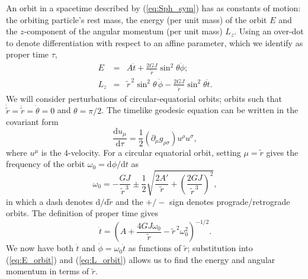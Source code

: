 \documentclass[aps,prd,amsfonts,amssymb,amsmath,nofootinbib,reprint,showpacs]{revtex4-1}
\newcommand{\eqnref}[1]{(\ref{eq:#1})}
\newcommand{\dd}{\ensuremath{\text{d}}}
\begin{document}
An orbit in a spacetime described by \eqnref{Sph_sym} has as constants of motion: the orbiting particle's rest mass, the energy (per unit mass) of the orbit $E$ and the $z$-component of the angular momentum (per unit mass) $L_z$. Using an over-dot to denote differentiation with respect to an affine parameter, which we identify as proper time $\tau$,
\begin{eqnarray}
\label{eq:E_orbit}
E & = & A\dot{t} + \frac{2GJ}{\widetilde{r}} \sin^2\theta\dot{\phi}; \\
L_z & = & \widetilde{r}^{\,2}\sin^2\theta\, \dot{\phi} - \frac{2GJ}{\widetilde{r}} \sin^2\theta\dot{t} .
\label{eq:L_orbit}
\end{eqnarray}
We will consider perturbations of circular-equatorial orbits; orbits such that $\dot{\widetilde{r}} = \ddot{\widetilde{r}} = \dot{\theta}= 0$ and $\theta = \pi/2$. The timelike geodesic equation can be written in the covariant form
\begin{equation}
\frac{\dd u_\mu}{\dd \tau} = \frac{1}{2} \left(\partial_\mu g_{\rho\sigma} \right) u^\rho u^\sigma, 
\end{equation}
where $u^\mu$ is the 4-velocity. For a circular equatorial orbit, setting $\mu = \widetilde{r}$ gives the frequency of the orbit $\omega_0 = \dd\phi/\dd t$ as
\begin{equation}
\omega_0 = -\frac{GJ}{\widetilde{r}^{\,3}} \pm \frac{1}{2} \sqrt{\frac{2A'}{\widetilde{r}} + \left(\frac{2GJ}{\widetilde{r}^{\,3}}\right)^2},
\label{eq:omz}
\end{equation}
in which a dash denotes $\dd/\dd\widetilde{r}$ and the $+/-$ sign denotes prograde/retrograde orbits. The definition of proper time gives
\begin{equation}
\dot{t}=\left(A + \frac{4GJ\omega_0}{\widetilde{r}} - \widetilde{r}^{\,2}\omega_0^2 \right)^{-1/2}.
\end{equation}
We now have both $\dot{t}$ and $\dot{\phi} = \omega_0\dot{t}$ as functions of $\widetilde{r}$; substitution into \eqnref{E_orbit} and \eqnref{L_orbit} allows us to find the energy and angular momentum in terms of $\widetilde{r}$.
\end{document}

